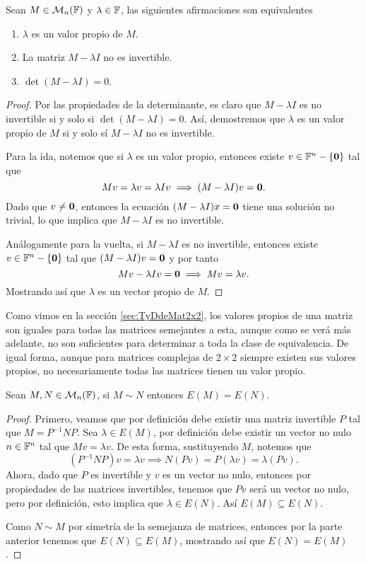 \begin{teor}\label{teor:PropVP}
  Sean $M \in \mathcal{M}_n(\mathbb{F})$ y $\lambda \in \mathbb{F}$, las siguientes afirmaciones son equivalentes
  \begin{enumerate}
    \item $\lambda$ es un valor propio de $M$.
    \item La matriz $M-\lambda I$ no es invertible.
    \item $\det(M-\lambda I) = 0$.
  \end{enumerate}
\end{teor}
\begin{proof}
  Por las propiedades de la determinante, es claro que $M-\lambda I$ es no invertible si y solo si $\det(M-\lambda I)=0$. Así, demostremos que $\lambda$ es un valor propio de $M$ si y solo sí $M-\lambda I$ no es invertible.

  Para la ida, notemos que si $\lambda$ es un valor propio, entonces existe $v \in \mathbb{F}^n-\{\mathbf{0}\}$ tal que 
    \[ Mv=\lambda v = \lambda Iv \implies (M-\lambda I)v = \mathbf{0}. \]
  Dado que $v \neq \mathbf{0}$, entonces la ecuación $(M-\lambda I)x = \mathbf{0}$ tiene una solución no trivial, lo que implica que $M-\lambda I$ es no invertible.

  Análogamente para la vuelta, si $M-\lambda I$ es no invertible, entonces existe $v \in \mathbb{F}^n-\{\mathbf{0}\}$ tal que $(M-\lambda I)v = \mathbf{0}$ y por tanto
  \[ Mv - \lambda Iv = \mathbf{0} \implies Mv = \lambda v. \]
  Mostrando así que $\lambda$ es un vector propio de $M$.
\end{proof}

Como vimos en la sección \ref{sec:TyDdeMat2x2}, los valores propios de una matriz son iguales para todas las matrices semejantes a esta, aunque como se verá más adelante, no son suficientes para determinar a toda la clase de equivalencia. De igual forma, aunque para matrices complejas de $2\times 2$ siempre existen sus valores propios, no necesariamente todas las matrices tienen un valor propio.

\begin{teor}
  Sean $M,N \in \mathcal{M}_n(\mathbb{F})$, si $M \sim N$ entonces $E(M) = E(N)$.
\end{teor}
\begin{proof}
  Primero, veamos que por definición debe existir una matriz invertible $P$ tal que $M = P^{-1} N P$. Sea $\lambda \in E(M)$, por definición debe existir un vector no nulo $n \in \mathbb{F}^n$ tal que $Mv = \lambda v$. De esta forma, sustituyendo $M$, notemos que
    \[ ( P^{-1} N P) v =  \lambda v  \implies  N(Pv) = P(\lambda v) = \lambda (Pv). \]
  Ahora, dado que $P$ es invertible y $v$ es un vector no nulo, entonces por propiedades de las matrices invertibles, tenemos que $Pv$ será un vector no nulo, pero por definición, esto implica que $\lambda \in E(N)$. Así $E(M) \subseteq E(N)$.

  Como $N \sim M$ por simetría de la semejanza de matrices, entonces por la parte anterior tenemos que $E(N) \subseteq E(M)$, mostrando así que $E(N) = E(M)$.
\end{proof}